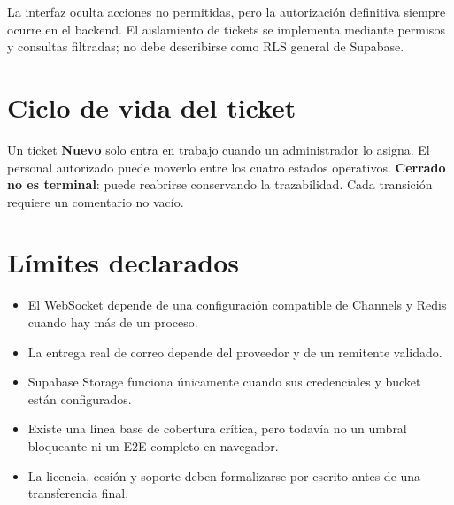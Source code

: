 La interfaz oculta acciones no permitidas, pero la autorización definitiva siempre ocurre en el
backend. El aislamiento de tickets se implementa mediante permisos y consultas filtradas; no debe
describirse como RLS general de Supabase.

\section{Ciclo de vida del ticket}

\begin{center}
\end{center}

Un ticket \textbf{Nuevo} solo entra en trabajo cuando un administrador lo asigna. El personal
autorizado puede moverlo entre los cuatro estados operativos. \textbf{Cerrado no es terminal}: puede
reabrirse conservando la trazabilidad. Cada transición requiere un comentario no vacío.

\section{Límites declarados}

\begin{itemize}
  \item El WebSocket depende de una configuración compatible de Channels y Redis cuando hay más de
  un proceso.
  \item La entrega real de correo depende del proveedor y de un remitente validado.
  \item Supabase Storage funciona únicamente cuando sus credenciales y bucket están configurados.
  \item Existe una línea base de cobertura crítica, pero todavía no un umbral bloqueante ni un E2E
        completo en navegador.
  \item La licencia, cesión y soporte deben formalizarse por escrito antes de una transferencia final.
\end{itemize}

